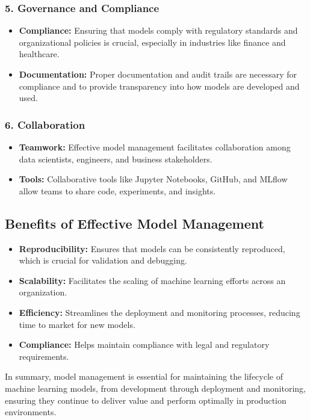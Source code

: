 \documentclass[letterpaper,12pt,notitlepage,twoside]{report}
\begin{document}
\subsubsection*{5. Governance and Compliance}
\begin{itemize}[noitemsep, topsep=0pt]
    \item \textbf{Compliance:} Ensuring that models comply with regulatory standards and organizational policies is crucial, especially in industries like finance and healthcare.
    \item \textbf{Documentation:} Proper documentation and audit trails are necessary for compliance and to provide transparency into how models are developed and used.
\end{itemize}

\subsubsection*{6. Collaboration}
\begin{itemize}[noitemsep, topsep=0pt]
    \item \textbf{Teamwork:} Effective model management facilitates collaboration among data scientists, engineers, and business stakeholders.
    \item \textbf{Tools:} Collaborative tools like Jupyter Notebooks, GitHub, and MLflow allow teams to share code, experiments, and insights.
\end{itemize}

\subsection*{Benefits of Effective Model Management}
\begin{itemize}[noitemsep, topsep=0pt]
    \item \textbf{Reproducibility:} Ensures that models can be consistently reproduced, which is crucial for validation and debugging.
    \item \textbf{Scalability:} Facilitates the scaling of machine learning efforts across an organization.
    \item \textbf{Efficiency:} Streamlines the deployment and monitoring processes, reducing time to market for new models.
    \item \textbf{Compliance:} Helps maintain compliance with legal and regulatory requirements.
\end{itemize}

In summary, model management is essential for maintaining the lifecycle of machine learning models, from development through deployment and monitoring, ensuring they continue to deliver value and perform optimally in production environments.
\end{document}
